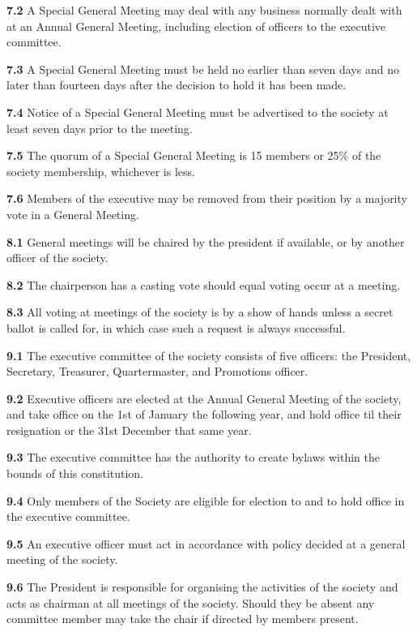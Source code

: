 \textbf{7.2} A Special General Meeting may deal with any business normally dealt with at an Annual General Meeting, including election of officers to the executive committee.

\textbf{7.3} A Special General Meeting must be held no earlier than seven days and no later than fourteen days after the decision to hold it has been made. 

\textbf{7.4} Notice of a Special General Meeting must be advertised to the society at least seven days prior to the meeting.

\textbf{7.5} The quorum of a Special General Meeting is 15 members or 25\% of the society membership, whichever is less.

\textbf{7.6} Members of the executive may be removed from their position by a majority vote in a General Meeting.

\vspace{1em}

\textbf{8.1} General meetings will be chaired by the president if available, or by another officer of the society.

\textbf{8.2} The chairperson has a casting vote should equal voting occur at a meeting.

\textbf{8.3} All voting at meetings of the society is by a show of hands unless a secret ballot is called for, in which case such a request is always successful.

\vspace{1em}

\textbf{9.1} The executive committee of the society consists of five officers: the President, Secretary, Treasurer, Quartermaster, and Promotions officer.

\textbf{9.2} Executive officers are elected at the Annual General Meeting of the society, and take office on the 1st of January the following year, and hold office til their resignation or the 31st December that same year.

\textbf{9.3} The executive committee has the authority to create bylaws within the bounds of this constitution.

\textbf{9.4} Only members of the Society are eligible for election to and to hold office in the executive committee.

\textbf{9.5} An executive officer must act in accordance with policy decided at a general meeting of the society.

\textbf{9.6} The President is responsible for organising the activities of the society and acts as chairman at all meetings of the society. Should they be absent any committee member may take the chair if directed by members present.

